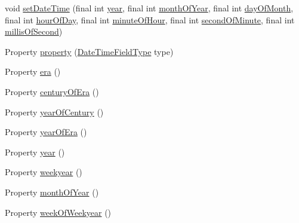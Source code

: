 \begin{DoxyCompactItemize}
\item 
void \hyperlink{classorg_1_1joda_1_1time_1_1_mutable_date_time_a74be1afafa3de685d690a2a5cbc4e52f}{set\-Date\-Time} (final int \hyperlink{classorg_1_1joda_1_1time_1_1_mutable_date_time_a33fe2fd92704573cfd1e0659cf26e0ae}{year}, final int \hyperlink{classorg_1_1joda_1_1time_1_1_mutable_date_time_a58a879bcc13ad752006977b73ccb01eb}{month\-Of\-Year}, final int \hyperlink{classorg_1_1joda_1_1time_1_1_mutable_date_time_a856f4c6ce8050846d320a4b88d7adcf4}{day\-Of\-Month}, final int \hyperlink{classorg_1_1joda_1_1time_1_1_mutable_date_time_a3bfaaca097843a8d526d12c03e1b53e2}{hour\-Of\-Day}, final int \hyperlink{classorg_1_1joda_1_1time_1_1_mutable_date_time_a30eda212c65711fde6149019836caebb}{minute\-Of\-Hour}, final int \hyperlink{classorg_1_1joda_1_1time_1_1_mutable_date_time_a2b00888de5a6e8cab5662bfe0ae4e9a9}{second\-Of\-Minute}, final int \hyperlink{classorg_1_1joda_1_1time_1_1_mutable_date_time_ac42752b6540827c2426fa9b5c48b0775}{millis\-Of\-Second})
\item 
Property \hyperlink{classorg_1_1joda_1_1time_1_1_mutable_date_time_a18204f367235de9bfa3ef89b001e41c4}{property} (\hyperlink{classorg_1_1joda_1_1time_1_1_date_time_field_type}{Date\-Time\-Field\-Type} type)
\item 
Property \hyperlink{classorg_1_1joda_1_1time_1_1_mutable_date_time_a2cddea1b78fe9c5c10d0c022b05f834d}{era} ()
\item 
Property \hyperlink{classorg_1_1joda_1_1time_1_1_mutable_date_time_a9a3e2a37d8a316411b3e41517054fb03}{century\-Of\-Era} ()
\item 
Property \hyperlink{classorg_1_1joda_1_1time_1_1_mutable_date_time_aa26e1a2f43915c4b04e7f9ee0b37d82f}{year\-Of\-Century} ()
\item 
Property \hyperlink{classorg_1_1joda_1_1time_1_1_mutable_date_time_a4bfd6da505d7f05111870b7c8c456cec}{year\-Of\-Era} ()
\item 
Property \hyperlink{classorg_1_1joda_1_1time_1_1_mutable_date_time_a33fe2fd92704573cfd1e0659cf26e0ae}{year} ()
\item 
Property \hyperlink{classorg_1_1joda_1_1time_1_1_mutable_date_time_aea22aed78d3f48ffdd9f2fbb8df8b7d5}{weekyear} ()
\item 
Property \hyperlink{classorg_1_1joda_1_1time_1_1_mutable_date_time_a58a879bcc13ad752006977b73ccb01eb}{month\-Of\-Year} ()
\item 
Property \hyperlink{classorg_1_1joda_1_1time_1_1_mutable_date_time_a199fb359629e27f0e13af2cfec8d5b6a}{week\-Of\-Weekyear} ()
\item 

\end{DoxyCompactItemize}
